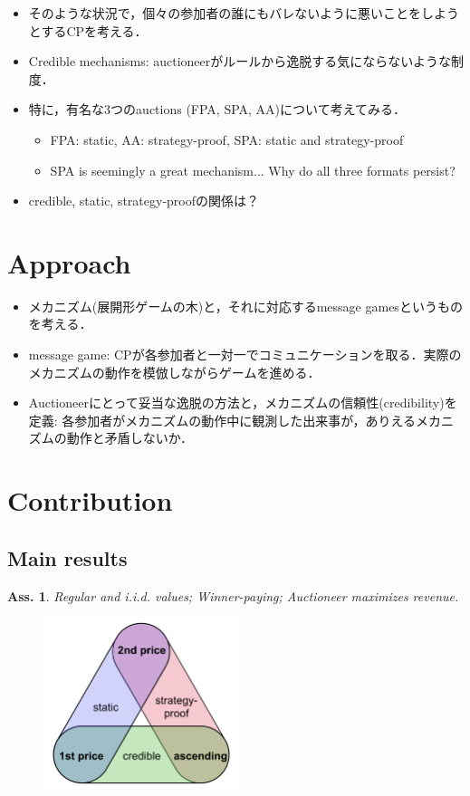 \documentclass[11pt,a4paper,dvipdfmx]{article}
\theoremstyle{plain}
\newtheorem{ass}{Ass.}
\newcommand{\1}{\mathbbm{1}}
\begin{document}
\begin{itemize}
\begin{enumerate}
	\end{enumerate}
	\item そのような状況で，個々の参加者の誰にもバレないように悪いことをしようとするCPを考える．
	\item Credible mechanisms: auctioneerがルールから逸脱する気にならないような制度．
	\item 特に，有名な3つのauctions (FPA, SPA, AA)について考えてみる．
	\begin{itemize}
		\item FPA: static, AA: strategy-proof, SPA: static and strategy-proof
		\item SPA is seemingly a great mechanism... Why do all three formats persist?
	\end{itemize}
	\item credible, static, strategy-proofの関係は？
\end{itemize}

\section{Approach}
\begin{itemize}
	\item メカニズム(展開形ゲームの木)と，それに対応するmessage gamesというものを考える．
	\item message game: CPが各参加者と一対一でコミュニケーションを取る．実際のメカニズムの動作を模倣しながらゲームを進める．
	\item Auctioneerにとって妥当な逸脱の方法と，メカニズムの信頼性(credibility)を定義: 各参加者がメカニズムの動作中に観測した出来事が，ありえるメカニズムの動作と矛盾しないか．
\end{itemize}

\section{Contribution}
\subsection{Main results}
\begin{ass}
Regular and i.i.d. values; Winner-paying; Auctioneer maximizes revenue.
\end{ass}
\begin{figure}[H]
  \centering
    \includegraphics[height=5cm]{image/trilemma.png}
    \label{fig1}
\end{figure}
\end{document}
